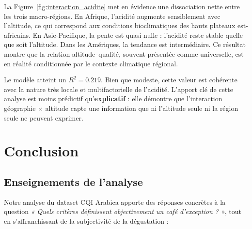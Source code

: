 \documentclass[12pt,a4paper]{article}
\begin{document}
La Figure~\ref{fig:interaction_acidite} met en évidence une dissociation nette entre les trois macro-régions. En Afrique, l'acidité augmente sensiblement avec l'altitude, ce qui correspond aux conditions bioclimatiques des hauts plateaux est-africains. En Asie-Pacifique, la pente est quasi nulle : l'acidité reste stable quelle que soit l'altitude. Dans les Amériques, la tendance est intermédiaire. Ce résultat montre que la relation altitude--qualité, souvent présentée comme universelle, est en réalité conditionnée par le contexte climatique régional.

Le modèle atteint un $R^2 = 0.219$. Bien que modeste, cette valeur est cohérente avec la nature très locale et multifactorielle de l'acidité. L'apport clé de cette analyse est moins prédictif qu'\textbf{explicatif} : elle démontre que l'interaction géographie $\times$ altitude capte une information que ni l'altitude seule ni la région seule ne peuvent exprimer.
\section{Conclusion}

\subsection{Enseignements de l'analyse}

Notre analyse du dataset CQI Arabica apporte des réponses concrètes à la question
\textit{« Quels critères définissent objectivement un café d'exception ? »}, tout en s'affranchissant de la subjectivité de la dégustation :
\end{document}
